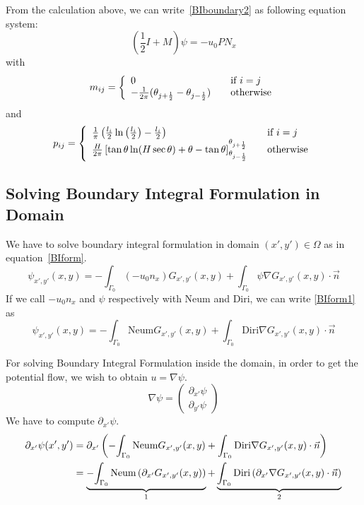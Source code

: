\documentclass[a4paper,12pt]{article}
\newcommand{\integ}[3]{%
\ensuremath{\displaystyle{\int^{#2}_{#1} #3}}}
\begin{document}
From the calculation above, we can write~\eqref{BIboundary2} as following equation  system:
\begin{equation}\label{SPL}
 \left( \frac{1}{2} I+M \right) \psi= -u_0 P N_x 
\end{equation}
with 
\[  m_{ij}= \left\{
  \begin{array}{l l}
    0 & \quad \text{if $i=j$ }\\
    -\frac{1}{2\pi}(\theta_{j+\frac{1}{2}}-\theta_{j-\frac{1}{2}}) & \quad \text{otherwise}
  \end{array} \right.\]
  and
  \[  p_{ij}= \left\{
  \begin{array}{l l}
     \frac{1}{\pi} \left( \frac{l_i}{2}\ln \left( \frac{l_i}{2} \right)-\frac{l_i}{2} \right) & \quad \text{if $i=j$ }\\
    \frac{H}{2\pi}\left [ \tan \theta \ln (H\sec\theta)+\theta-\tan\theta \right ]_{\theta_{j-\frac{1}{2}}}^{\theta_{j+\frac{1}{2}}} & \quad \text{otherwise}
  \end{array} \right.\]

\subsection{Solving Boundary Integral Formulation in Domain}

We have to solve boundary integral formulation in domain $(x',y')\in \Omega$ as in equation~\eqref{BIform}. 
\begin{equation}
 \psi_{x',y'}(x,y)=-\integ{\Gamma_0}{}{(-u_0 n_x)G_{x',y'}(x,y)} + \integ{\Gamma_0}{}{\psi\nabla G_{x',y'}(x,y)\cdot \vec{n}} \label{BIform1}
\end{equation}
If we call $-u_0 n_x$ and $\psi$ respectively with Neum and Diri, we can write \ref{BIform1} as
\begin{equation}
 \psi_{x',y'}(x,y)=-\integ{\Gamma_0}{}{\text{Neum}G_{x',y'}(x,y)} + \integ{\Gamma_0}{}{\text{Diri}\nabla G_{x',y'}(x,y)\cdot \vec{n}}
\end{equation}

For solving Boundary Integral Formulation inside the domain, in order to get the potential flow, we wish to obtain $u=\nabla\psi$.
\begin{equation}
 \nabla\psi=\left(\begin{array}{c}
      \partial_{x'}\psi \\
      \partial_{y'}\psi
    \end{array}\right)
\end{equation}
 We have to compute $\partial_{x'}\psi$.
\begin{align}
 \partial_{x'}\psi(x',y')&=\partial_{x'}\left(-\integ{\Gamma_0}{}{\text{Neum}G_{x',y'}(x,y)} + \integ{\Gamma_0}{}{\text{Diri}\nabla G_{x',y'}(x,y)\cdot \vec{n}} \right)\\
&=  \underbrace{-\integ{\Gamma_0}{}{\text{Neum} \left(\partial_{x'}G_{x',y'}(x,y)\right)}}_\text{1}  +  
\underbrace{\integ{\Gamma_0}{}{\text{Diri}\left(\partial_{x'}\nabla G_{x',y'}(x,y)\cdot \vec{n}\right)}}_\text{2} 
\end{align}
\end{document}
